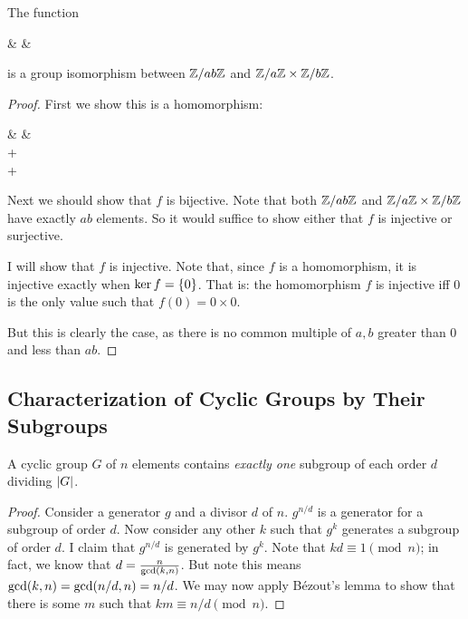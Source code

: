 \begin{theorem}
  The function

  \begin{nedqn}
  & \mapsto &
     \times {}
  \end{nedqn}

  \noindent
  is a group isomorphism between $\mathbb{Z} / ab\mathbb{Z}$ and $\mathbb{Z} / a\mathbb{Z} \times \mathbb{Z} / b\mathbb{Z}$.
\end{theorem}

\begin{proof}
  First we show this is a homomorphism:

  \begin{nedqn}
  & \mapsto &
     \times {}
  \\
  \eqcol
     \times {}
    +
     \times {}
  \\
  \eqcol
     + 
  \end{nedqn}

  Next we should show that $f$ is bijective. Note that both $\mathbb{Z} / ab\mathbb{Z}$
  and $\mathbb{Z} / a\mathbb{Z} \times \mathbb{Z} / b\mathbb{Z}$ have exactly $ab$ elements. So it would
  suffice to show either that $f$ is injective or surjective.

  I will show that $f$ is injective. Note that, since $f$ is a
  homomorphism, it is injective exactly when $\ker f = \left\{ 0 \right\}$. That
  is: the homomorphism $f$ is injective iff $0$ is the only value such
  that $f(0) = 0 \times 0$.

  But this is clearly the case, as there is no common multiple of $a, b$
  greater than $0$ and less than $ab$.
\end{proof}

\subsection{Characterization of Cyclic Groups by Their Subgroups}

\begin{proposition}
  A cyclic group $G$ of $n$ elements contains \emph{exactly one}
  subgroup of each order $d$ dividing $|G|$.
\end{proposition}

\begin{proof}
  Consider a generator $g$ and a divisor $d$ of $n$. $g^{n/d}$ is a
  generator for a subgroup of order $d$. Now consider any other $k$ such
  that $g^k$ generates a subgroup of order $d$. I claim that $g^{n/d}$
  is generated by $g^k$. Note that $kd \equiv 1 \pmod{n}$; in fact, we
  know that $d = \frac{n}{\gcd\mathopen{}\left( {k, n} \right)\mathclose{}}$. But note this means $\gcd\mathopen{}\left( {k,
  n} \right)\mathclose{} = \gcd\mathopen{}\left( {n/d, n} \right)\mathclose{} = n/d$. We may now apply Bézout's lemma to show
  that there is some $m$ such that $km \equiv n/d \pmod{n}$.
\end{proof}

